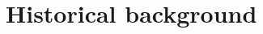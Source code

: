 \documentclass[../main.tex]{subfiles}
\begin{document}
\chapter{Historical background} %

\label{Chapter01} %




\end{document}
